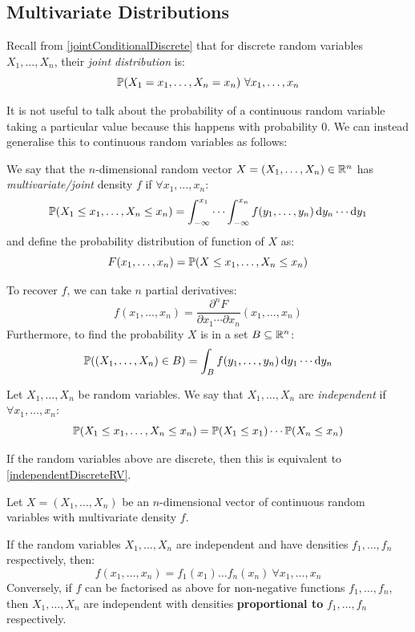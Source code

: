 \documentclass[../main.tex]{subfiles}
\begin{document}
\subsection{Multivariate Distributions}
\begin{remark}[Recap]
  Recall from \cref{jointConditionalDiscrete} that for discrete random variables $X_1, \ldots, X_n$, their \textit{joint distribution} is:
  \[
    \P(X_1 = x_1, \ldots, X_n = x_n)\ \forall x_1, \ldots, x_n
  \]
\end{remark}
It is not useful to talk about the probability of a continuous random variable taking a particular value because this happens with probability 0.
We can instead generalise this to continuous random variables as follows:
\begin{definition}
  We say that the $n$-dimensional random vector $X = (X_1, \ldots, X_n) \in \R^{n}$ has \textit{multivariate/joint} density $f$ if $\forall x_1, \ldots, x_n$:
  \[
    \P(X_1 \leq x_1, \ldots, X_n \leq x_n) = \int_{-\infty}^{x_1} \cdots \int_{-\infty}^{x_n} f(y_1, \ldots, y_n) \d{y_n} \cdots \d{y_1}
  \]
  and define the probability distribution of function of $X$ as:
  \[
    F(x_1, \ldots, x_n) = \P(X \leq x_1, \ldots, X_n \leq x_n)
  \]
\end{definition}
To recover $f$, we can take $n$ partial derivatives:
\begin{equation}
  f(x_1, \ldots, x_n) = \frac{\partial^{n}F}{\partial x_1 \cdots \partial x_n}(x_1, \ldots, x_n) \label{derivativeDensity}
\end{equation}
Furthermore, to find the probability $X$ is in a set $B \subseteq \R^{n}$:
\[
  \P((X_1, \ldots, X_n) \in B) = \int_{B} f(y_1, \ldots, y_n) \d{y_1} \cdots \d{y_n}
\]
\begin{definition}[Independence]
  Let $X_1, \ldots, X_n$ be random variables.
  We say that $X_1, \ldots, X_n$ are \textit{independent} if $\forall x_1, \ldots, x_n$:
  \[
    \P(X_1 \leq x_1, \ldots, X_n \leq x_n) = \P(X_1 \leq x_1) \cdots \P(X_n \leq x_n)
  \]
\end{definition}
\begin{remark}
  If the random variables above are discrete, then this is equivalent to \cref{independentDiscreteRV}.
\end{remark}
\begin{theorem}
  Let $X = (X_1, \ldots, X_n)$ be an $n$-dimensional vector of continuous random variables with multivariate density $f$. \label{densityFactor}

  If the random variables $X_1, \ldots, X_n$ are independent and have densities $f_1, \ldots, f_n$ respectively, then:
  \[
    f(x_1, \ldots, x_n) = f_1(x_1) \ldots f_n(x_n)\ \forall x_1, \ldots, x_n
  \]
  Conversely, if $f$ can be factorised as above for non-negative functions $f_1, \ldots, f_n$, then $X_1, \ldots, X_n$ are independent with densities \textbf{proportional to} $f_1, \ldots, f_n$ respectively.
\end{theorem}
\end{document}
